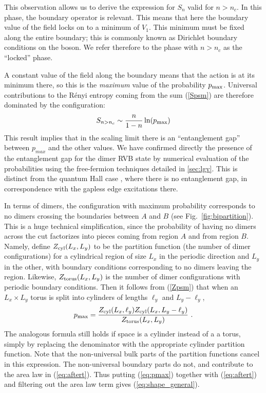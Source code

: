 \documentclass[11pt]{iopart}
\begin{document}
This observation allows us to derive the expression for $S_n$ valid for $n>n_c$. In this phase, the boundary operator is relevant. This means that here the boundary value of the field locks on to a minimum of $V_1$. This minimum must be fixed along the entire boundary; this is commonly known as Dirichlet boundary conditions on the boson. We refer therefore to the phase with $n>n_c$ as the ``locked'' phase.

A constant value of the field along the boundary means that the action is at its minimum there, so this is the {\em maximum} value of the probability $p_{\rm max}$. 
Universal contributions to the R\'enyi entropy coming from the sum (\ref{Spsm})  are therefore dominated by the configuration:
\begin{equation}\label{eq:aftert}
 S_{n>n_c}\sim \frac{n}{1-n}\ln (p_{\rm max})
\end{equation}
This result implies that in the scaling limit there is an ``entanglement gap'' between $p_{max}$ and the other values. We have confirmed directly the presence of the entanglement gap for the dimer RVB state by numerical evaluation of the probabilities using the free-fermion techniques detailed in \ref{sec:lgv}.  This is distinct from the quantum Hall case \cite{HaldaneLi}, where there is no entanglement gap, in correspondence with the gapless edge excitations there.
 
 In terms of dimers, the configuration with maximum probability corresponds to no dimers crossing the boundaries between $A$ and $B$ (see Fig.~\ref{fig:bipartition}). This is a huge technical simplification, since the probability of having no dimers across the cut factorizes into pieces coming from region $A$ and from region $B$. Namely, define $Z_{\rm cyl}(L_x, L_y)$ to be the partition function (the number of dimer configurations) for a cylindrical region of size $L_x$ in the periodic direction and $L_y$ in the other, with boundary conditions corresponding to no dimers leaving the region. Likewise, $Z_{\rm torus}(L_x,L_y)$  is the number of dimer configurations with periodic boundary conditions. Then it follows from (\ref{Zpsm}) that when an $L_x\times L_y$ torus is split into cylinders of lengths $\ell_y$ and $L_y-\ell_y$,
\begin{equation}\label{eq:pmax}
 p_{\rm max}=\frac{Z_{\rm cyl}(L_x,\ell_y)Z_{\rm cyl}(L_x,L_y-\ell_y)}{Z_{\rm torus}(L_x,L_y)} \ .
\end{equation}
The analogous formula still holds if space is a cylinder instead of a a torus, simply by replacing the denominator with the appropriate cylinder partition function. 
Note that the non-universal bulk parts of the partition functions cancel in this expression. The non-universal boundary parts do not, and contribute to the area law in (\ref{eq:aftert}). Thus putting (\ref{eq:pmax}) together with (\ref{eq:aftert}) and filtering out the area law term gives (\ref{eq:shape_general}).
\end{document}
